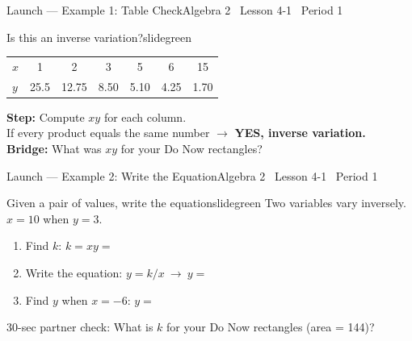 \documentclass[aspectratio=169, 11pt]{beamer}
\begin{document}
\begin{frame}{Launch --- Example 1: Table Check}{Algebra 2 \textperiodcentered\ Lesson 4-1 \textperiodcentered\ Period 1}
\vspace{0.2cm}
\begin{projcard}{Is this an inverse variation?}{slidegreen}
\begin{tabular}{l|cccccc}
\(x\) & 1 & 2 & 3 & 5 & 6 & 15 \\
\(y\) & 25.5 & 12.75 & 8.50 & 5.10 & 4.25 & 1.70 \\
\end{tabular}

\vspace{0.3cm}
\textbf{Step:} Compute \(xy\) for each column.\\
If every product equals the same number \(\rightarrow\) \textbf{YES, inverse variation.}\\[0.15cm]
\textbf{Bridge:} What was \(xy\) for your Do Now rectangles?
\end{projcard}
\end{frame}

\begin{frame}{Launch --- Example 2: Write the Equation}{Algebra 2 \textperiodcentered\ Lesson 4-1 \textperiodcentered\ Period 1}
\vspace{0.1cm}
\begin{projcard}{Given a pair of values, write the equation}{slidegreen}
\small Two variables vary inversely. \(x = 10\) when \(y = 3\).

\vspace{0.15cm}
\begin{enumerate}
  \setlength{\itemsep}{1pt}
  \item Find \(k\): \(k = xy = \) \underline{\hspace{2cm}}
  \item Write the equation: \(y = k/x\ \longrightarrow\ y = \) \underline{\hspace{2cm}}
  \item Find \(y\) when \(x = -6\): \(y = \) \underline{\hspace{2cm}}
\end{enumerate}
\vspace{0.1cm}
\small\textcolor{slidegray}{30-sec partner check: What is \(k\) for your Do Now rectangles (area = 144)?}
\end{projcard}
\end{frame}
\end{document}
